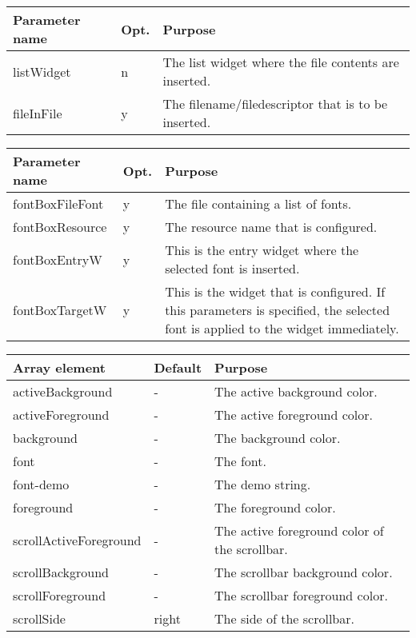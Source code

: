 {\newpage
\clearpage
\samepage \begin{tabular}{|l|l|p{6.5cm}|} \hline
Parameter name & Opt. & Purpose \\  \hline
listWidget     & n    & The list widget where the file
                        contents are inserted. \\  \hline
fileInFile     & y    & The filename/filedescriptor that is
                        to be inserted. \\  \hline
\end{tabular}
}

{\newpage
\clearpage
\samepage \begin{tabular}{|l|l|p{6.7cm}|} \hline
Parameter name  & Opt. & Purpose\\  \hline
fontBoxFileFont & y    & The file containing a list of
                         fonts.\\  \hline 
fontBoxResource & y    & The resource name that is
                         configured.\\  \hline
fontBoxEntryW   & y    & This is the entry widget where the
                         selected font is inserted.\\  \hline
fontBoxTargetW  & y    & This is the widget that is
                         configured. If this parameters is
                         specified, the selected font is
                         applied to the widget
                         immediately.\\  \hline
\end{tabular}
}

{\newpage
\clearpage
\samepage \begin{tabular}{|l|l|p{5.5cm}|} \hline
Array element          & Default & Purpose\\  \hline
activeBackground       & -       & The active background
                                   color.\\  \hline
activeForeground       & -       & The active foreground
                                   color.\\  \hline
background             & -       & The background color.\\  \hline
font                   & -       & The font.\\  \hline
font-demo              & -       & The demo string.\\  \hline
foreground             & -       & The foreground color.\\  \hline
scrollActiveForeground & -       & The active foreground
                                   color of the scrollbar.\\  \hline 
scrollBackground       & -       & The scrollbar background
                                   color.\\  \hline
scrollForeground       & -       & The scrollbar foreground
                                   color.\\  \hline
scrollSide             & right   & The side of the
                                   scrollbar.\\  \hline 
\end{tabular}
}

